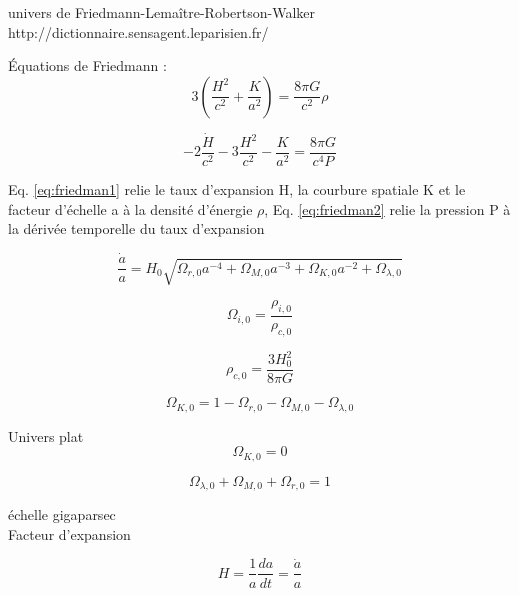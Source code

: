 univers de Friedmann-Lemaître-Robertson-Walker  
http://dictionnaire.sensagent.leparisien.fr/%
 
Équations de Friedmann : 
\begin{equation}
3 \left( \frac{H^2}{c^2} +\frac{K}{a^2} \right) = \frac{8 \pi G }{c^2} \rho
\label{eq:friedman1}
\end{equation}

\begin{equation}
-2 \frac{ \dot{H}}{c^2} -3 \frac{H^2}{c^2} -\frac{K}{a^2} = \frac{8 \pi G }{c^4 P}
\label{eq:friedman2}
\end{equation}

Eq. \ref{eq:friedman1} relie le taux d'expansion H, la courbure spatiale K et le facteur d'échelle a à la densité d'énergie $\rho$, 
Eq. \ref{eq:friedman2} relie la pression P à la dérivée temporelle du taux d'expansion
 
 
 
\begin{equation}
\frac{\dot{a}}{a} = H_0 \sqrt{ \Omega_{r,0} a^{-4} +  \Omega_{M,0} a^{-3} + \Omega_{K,0}a^{-2} + \Omega_{\lambda,0}  } 
\end{equation}


\begin{equation}
 \Omega_{i,0} = \frac{\rho_{i,0}}{\rho_{c,0}}
 \end{equation}

\begin{equation}
\rho_{c,0} = \frac{3H_0^2}{8\pi G}
 \end{equation}
 
 
\begin{equation}
 \Omega_{K,0} = 1 - \Omega_{r,0} - \Omega_{M,0} - \Omega_{\lambda,0} 
 \end{equation}

Univers plat
\begin{equation}
 \Omega_{K,0} = 0
 \end{equation}

\begin{equation}
\Omega_{\lambda,0} +  \Omega_{M,0} + \Omega_{r,0} =1
 \end{equation}




échelle gigaparsec\\
Facteur d'expansion


\begin{equation}
H=\frac{1}{a} \frac{da}{dt} = \frac{\dot{a}}{a}
\end{equation}

